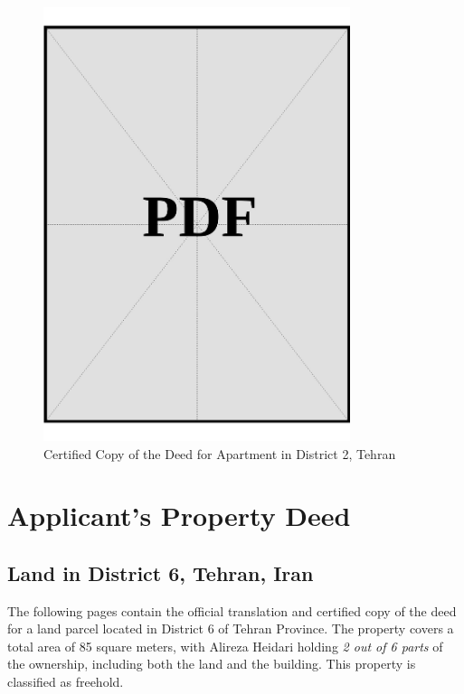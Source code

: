 \vspace*{\fill}
\begin{figure}[h]
    \centering
    \includegraphics[page=1, width=0.8\textwidth]{../docs/sponsor/funds/property-deeds/property-2/certified-copies.pdf}
    \caption{Certified Copy of the Deed for Apartment in District 2, Tehran}
    \label{fig:sponsor-apartment-dist2-tehran-certified-copy}
\end{figure}
\vspace*{\fill}

\clearpage

\section{Applicant's Property Deed}

\subsection{Land in District 6, Tehran, Iran}\label{sec:applicant-land-dist6-tehran}

The following pages contain the official translation and certified copy of the deed for a land parcel located in District 6 of Tehran Province. The property covers a total area of 85 square meters, with Alireza Heidari holding \textit{2 out of 6 parts} of the ownership, including both the land and the building. This property is classified as freehold.


